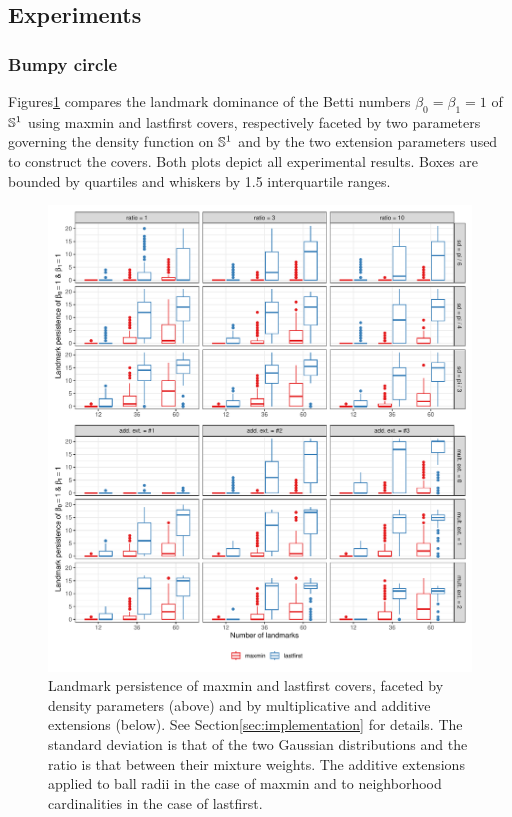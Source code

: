 \documentclass{article}
\begin{document}
\hypertarget{experiments-1}{%
\subsection{Experiments}\label{experiments-1}}

\hypertarget{bumpy-circle-2}{%
\subsubsection{Bumpy circle}\label{bumpy-circle-2}}

Figures\nbs\ref{fig:bumpy-distribution} compares the landmark dominance
of the Betti numbers \(\beta_0 = \beta_1 = 1\) of \(\mathbb{S}^1\) using
maxmin and lastfirst covers, respectively faceted by two parameters
governing the density function on \(\mathbb{S}^1\) and by the two extension
parameters used to construct the covers. Both plots depict all
experimental results. Boxes are bounded by quartiles and whiskers by 1.5
interquartile ranges.

\begin{figure}
\includegraphics[width=\textwidth]{bumpy-persistence-distribution-extensions}
\caption{
Landmark persistence of maxmin and lastfirst covers, faceted by density parameters (above) and by multiplicative and additive extensions (below).
See Section\nbs\ref{sec:implementation} for details.
The standard deviation is that of the two Gaussian distributions and the ratio is that between their mixture weights.
The additive extensions applied to ball radii in the case of maxmin and to neighborhood cardinalities in the case of lastfirst.
\label{fig:bumpy-distribution}
}
\end{figure}
\end{document}
